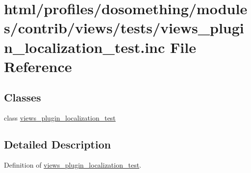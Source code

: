 \hypertarget{views__plugin__localization__test_8inc}{
\section{html/profiles/dosomething/modules/contrib/views/tests/views\_\-plugin\_\-localization\_\-test.inc File Reference}
\label{views__plugin__localization__test_8inc}
}
\subsection*{Classes}
\begin{DoxyCompactItemize}
\item 
class \hyperlink{classviews__plugin__localization__test}{views\_\-plugin\_\-localization\_\-test}
\end{DoxyCompactItemize}


\subsection{Detailed Description}
Definition of \hyperlink{classviews__plugin__localization__test}{views\_\-plugin\_\-localization\_\-test}. 